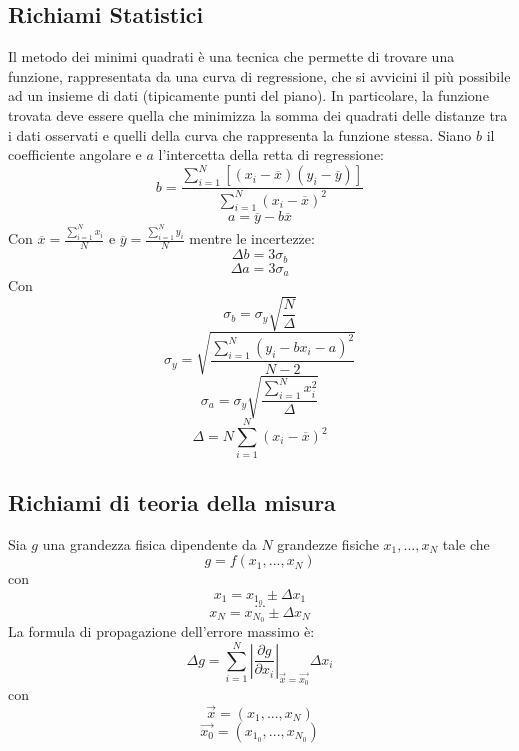 \subsection{Richiami Statistici}
Il metodo dei minimi quadrati è una tecnica che permette di trovare una funzione, rappresentata da una curva di regressione, che si avvicini il più possibile ad un insieme di dati (tipicamente punti del piano). In particolare, la funzione trovata deve essere quella che minimizza la somma dei quadrati delle distanze tra i dati osservati e quelli della curva che rappresenta la funzione stessa. Siano $b$ il coefficiente angolare e $a$ l'intercetta della retta di regressione:
\begin{equation}
	b=\frac{\displaystyle\sum_{i=1}^{N}[(x_i-\overline{x})(y_i-\overline{y})]}{\displaystyle\sum_{i=1}^{N}(x_i-\overline{x})^2}
\end{equation}
\begin{equation}
	a=\overline{y}-b\overline{x}
\end{equation}
Con $\overline{x}=\frac{\displaystyle\sum_{i=1}^{N}x_i}{N}$ e $\overline{y}=\frac{\displaystyle\sum_{i=1}^{N}y_i}{N}$
mentre le incertezze:
\begin{equation}
	\Delta b=3\sigma_b
\end{equation}
\begin{equation}
	\Delta a=3\sigma_a
\end{equation}
Con $$\sigma_b=\sigma_y\sqrt{\frac{N}{\Delta}}$$
$$\sigma_y=\sqrt{\frac{\displaystyle\sum_{i=1}^{N}(y_i-bx_i-a)^2}{N-2}}$$
$$\sigma_a=\sigma_y\sqrt{\frac{\displaystyle\sum_{i=1}^{N}x_i^2}{\Delta}}$$
$$\Delta=N\displaystyle\sum_{i=1}^{N}(x_i-\overline{x})^2$$

\subsection{Richiami di teoria della misura}
Sia $g$ una grandezza fisica dipendente da $N$ grandezze fisiche $x_1,...,x_N$ tale che
\begin{equation}
	g=f(x_1,...,x_N)
\end{equation}
con
\begin{equation}
	x_1 = x_{1_0}\pm \Delta x_1
\end{equation}
$$ ... $$
\begin{equation}
	x_N = x_{N_0}\pm \Delta x_N
\end{equation}
La formula di propagazione dell'errore massimo è:
\begin{equation}
	\Delta g=\displaystyle\sum_{i=1}^{N}\left|\frac{\partial g}{\partial x_i}\right|_{\vec{x}=\vec{x_0}}\Delta x_i
\end{equation}
con
\begin{equation}
	\vec{x}=(x_1,...,x_N)
\end{equation}
\begin{equation}
	\vec{x_0}=(x_{1_0},...,x_{N_0})
\end{equation}

